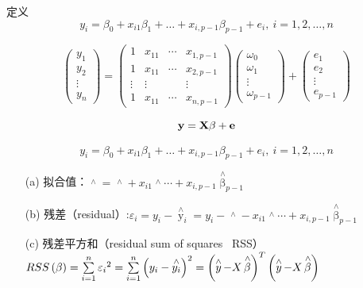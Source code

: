 \documentclass[xetex,mathserif,serif]{beamer}
\begin{document}
\begin{frame}{定义}
\[ y_i = \beta_0+x_{i1}\beta_1+ \dots + x_{i,p-1}\beta_{p-1}+e_i, \ i=1,2,\dots,n\]

\[\left( {\begin{array}{*{20}{c}}
{{y_1}}\\
{{y_2}}\\
 \vdots \\
{{y_n}}
\end{array}} \right) = \left( {\begin{array}{*{20}{c}}
1&{{x_{11}}}& \cdots &{{x_{1,p - 1}}}\\
1&{{x_{11}}}& \cdots &{{x_{2,p - 1}}}\\
 \vdots & \vdots &{}& \vdots \\
1&{{x_{11}}}& \cdots &{{x_{n,p - 1}}}
\end{array}} \right)\left( {\begin{array}{*{20}{c}}
{{\omega _0}}\\
{{\omega _1}}\\
 \vdots \\
{{\omega _{p - 1}}}
\end{array}} \right) + \left( {\begin{array}{*{20}{c}}
{{e_1}}\\
{{e_2}}\\
 \vdots \\
{{e_{p - 1}}}
\end{array}} \right)\]

\[\bf{y}=\bf{X\beta}+\bf{e}\]

\end{frame}

\begin{frame}
\[ y_i = \beta_0+x_{i1}\beta_1+ \dots + x_{i,p-1}\beta_{p-1}+e_i, \ i=1,2,\dots,n\]
\begin{itemize}
  \item[(a)] 拟合值：$\mathop {{y_i}}\limits^ \wedge   = \mathop {{\beta _0}}\limits^ \wedge   + {x_{i1}}\mathop {{\beta _1}}\limits^ \wedge   \cdots  + {x_{i,p - 1}}{{\mathop \beta \limits^ \wedge}  _{p - 1}}$
  \item[(b)] 残差（residual）:${\varepsilon _i} = {y_i} - {{\mathop y\limits^ \wedge}  _i} = {y_i} - \mathop {{\beta _0}}\limits^ \wedge   - {x_{i1}}\mathop {{\beta _1}}\limits^ \wedge   \cdots  + {x_{i,p - 1}}{{\mathop \beta \limits^ \wedge }_{p - 1}}$
  \item[(c)] 残差平方和（residual sum of squares \ RSS）\ $RSS\left( \beta  \right) = \sum\limits_{i = 1}^n {{\varepsilon _i}^2}  = \sum\limits_{i = 1}^n {{{\left( {{y_i} - \mathop {{y_i}}\limits^ \wedge  } \right)}^2}}  = {\left( {\mathop {{\rm{ }}y}\limits^ \wedge   - X\mathop \beta \limits^ \wedge  } \right)^T}\left( {\mathop {{\rm{ }}y}\limits^ \wedge   - X\mathop \beta \limits^ \wedge  } \right)$
\end{itemize}
\end{frame}
\end{document}
